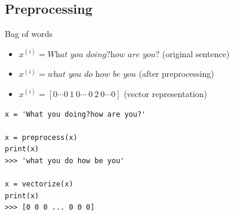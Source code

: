 \documentclass{beamer}
\begin{document}
\subsection{Preprocessing}

\begin{frame}[fragile]{Bag of words}
	\begin{itemize}
		\item $x^{(i)}=\textit{What you doing?how are you?}$ (original sentence)
		\item $x^{(i)}=\textit{what you do how be you}$ (after preprocessing)
		\item $x^{(i)}=[0\cdots0~1~0\cdots~0~2~0\cdots0]$ (vector representation)
	\end{itemize}
\begin{verbatim}
x = 'What you doing?how are you?'

x = preprocess(x)
print(x)
>>> 'what you do how be you'

x = vectorize(x)
print(x)
>>> [0 0 0 ... 0 0 0]
\end{verbatim}
\end{frame}
\end{document}
